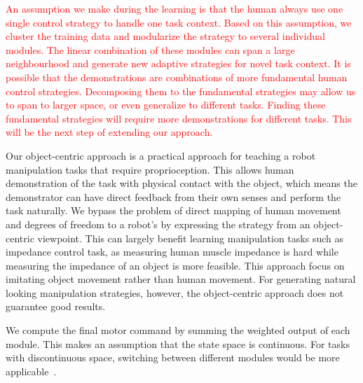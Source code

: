 \textcolor{red}{An assumption we make during the learning is that the human always use one single control strategy to handle one task context. Based on this assumption, we cluster the training data and modularize the strategy to several individual modules. The linear combination of these modules can span a large neighbourhood and generate new adaptive strategies for novel task context. It is possible that the demonstrations are combinations of more fundamental human control strategies. Decomposing them to the fundamental strategies may allow us to span to larger space, or even generalize to different tasks. Finding these fundamental strategies will require more demonstrations for different tasks. This will be the next step of extending our approach. }

Our object-centric approach is a practical approach for teaching a
robot manipulation tasks that require proprioception. This allows
human demonstration of the task with physical contact with the object,
which means the demonstrator can have direct feedback from their own
senses and perform the task naturally. We bypass the problem of direct
mapping of human movement and degrees of freedom to a robot's by
expressing the strategy from an object-centric viewpoint. This can
largely benefit learning manipulation tasks such as impedance control
task, as measuring human muscle impedance is hard while measuring the
impedance of an object is more feasible. This approach focus on imitating object movement rather than human movement. For generating natural looking manipulation strategies, however, the object-centric approach does not guarantee good results.

We compute the final motor command by summing the weighted output of
each module. This makes an assumption that the state space is
continuous. For tasks with discontinuous space, switching between different modules would be more applicable~\citep{narendra1995adaptation,nakanishi2013spatio}.


